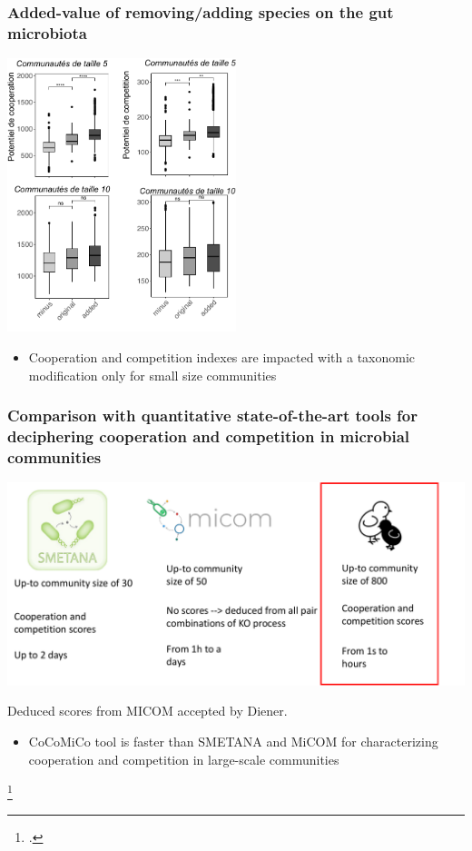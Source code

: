 \documentclass[8pt,usenames,dvipsnames]{beamer}
\begin{document}
\begin{frame}
\frametitle{Added-value of removing/adding species on the gut microbiota}
\centering
\includegraphics[width=0.5\textwidth]{figures/added-value.pdf}
\begin{alertblock}{}
\begin{itemize}
\item Cooperation and competition indexes are impacted with a taxonomic modification only for small size communities
\end{itemize}
\end{alertblock}
\end{frame}

\begin{frame}
\frametitle{Comparison with quantitative state-of-the-art tools for deciphering cooperation and competition in microbial communities}
\includegraphics[width=\textwidth]{figures/comparaison-sota-coop-comp.pdf}

Deduced scores from MICOM accepted by Diener.

\begin{alertblock}{}
\begin{itemize}
\item CoCoMiCo tool is faster than SMETANA and MiCOM for characterizing cooperation and competition in large-scale communities
\end{itemize}
\end{alertblock}

\footcite{Zelezniak2015,diener2020}
\end{frame}
\end{document}

